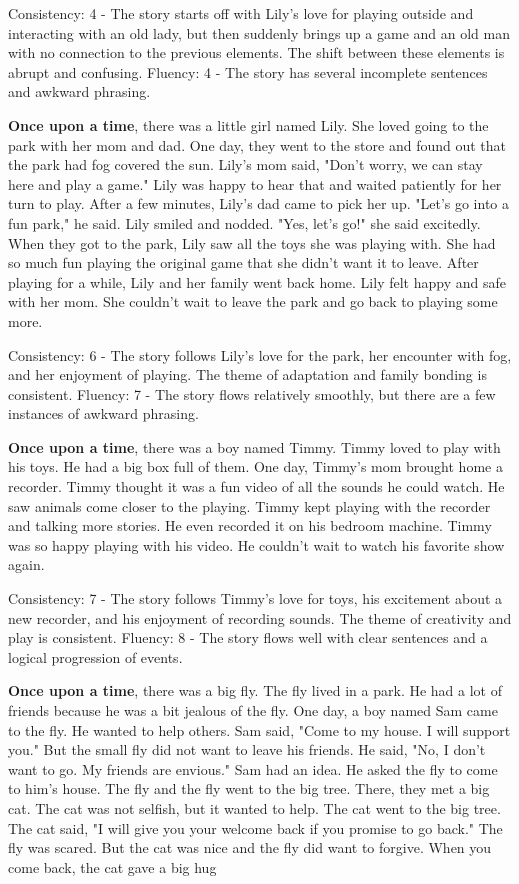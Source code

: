 \documentclass{article}
\begin{document}
Consistency: 4 - The story starts off with Lily's love for playing outside and interacting with an old lady, but then suddenly brings up a game and an old man with no connection to the previous elements. The shift between these elements is abrupt and confusing.
Fluency: 4 - The story has several incomplete sentences and awkward phrasing.

\textbf{Once upon a time}, there was a little girl named Lily. She loved going to the park with her mom and dad. One day, they went to the store and found out that the park had fog covered the sun. Lily's mom said, "Don't worry, we can stay here and play a game." Lily was happy to hear that and waited patiently for her turn to play. After a few minutes, Lily's dad came to pick her up. "Let's go into a fun park," he said. Lily smiled and nodded. "Yes, let's go!" she said excitedly. When they got to the park, Lily saw all the toys she was playing with. She had so much fun playing the original game that she didn't want it to leave. After playing for a while, Lily and her family went back home. Lily felt happy and safe with her mom. She couldn't wait to leave the park and go back to playing some more.

Consistency: 6 - The story follows Lily's love for the park, her encounter with fog, and her enjoyment of playing. The theme of adaptation and family bonding is consistent.
Fluency: 7 - The story flows relatively smoothly, but there are a few instances of awkward phrasing.

\textbf{Once upon a time}, there was a boy named Timmy. Timmy loved to play with his toys. He had a big box full of them. One day, Timmy's mom brought home a recorder. Timmy thought it was a fun video of all the sounds he could watch. He saw animals come closer to the playing. Timmy kept playing with the recorder and talking more stories. He even recorded it on his bedroom machine. Timmy was so happy playing with his video. He couldn't wait to watch his favorite show again.

Consistency: 7 - The story follows Timmy's love for toys, his excitement about a new recorder, and his enjoyment of recording sounds. The theme of creativity and play is consistent.
Fluency: 8 - The story flows well with clear sentences and a logical progression of events.

\textbf{Once upon a time}, there was a big fly. The fly lived in a park. He had a lot of friends because he was a bit jealous of the fly. One day, a boy named Sam came to the fly. He wanted to help others. Sam said, "Come to my house. I will support you." But the small fly did not want to leave his friends. He said, "No, I don't want to go. My friends are envious." Sam had an idea. He asked the fly to come to him's house. The fly and the fly went to the big tree. There, they met a big cat. The cat was not selfish, but it wanted to help. The cat went to the big tree. The cat said, "I will give you your welcome back if you promise to go back." The fly was scared. But the cat was nice and the fly did want to forgive. When you come back, the cat gave a big hug
\end{document}
